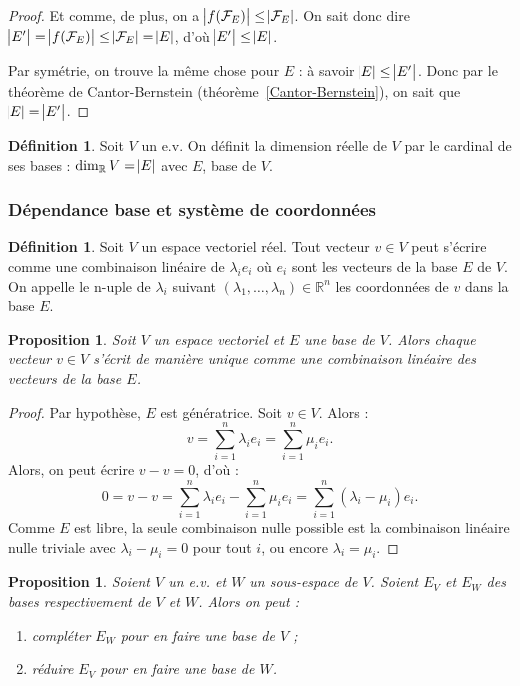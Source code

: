 \documentclass{article}
\newcommand{\R}{\mathbb R}
\newtheorem{prp}[thm]{Proposition}
\theoremstyle{definition}
\newtheorem{déf}[thm]{Définition}
\theoremstyle{remark}
\begin{document}
\begin{proof}
		Et comme, de plus, on a $\abs {f(\mathcal F_E)} \leq \abs {\mathcal F_E}$. On sait donc dire $\abs {E'} = \abs {f(\mathcal F_E)} \leq \abs {\mathcal F_E} = \abs E$,
		d'où $\abs {E'} \leq \abs E$.

		Par symétrie, on trouve la même chose pour $E$ : à savoir $\abs E \leq \abs {E'}$. Donc par le théorème de Cantor-Bernstein (théorème~\ref{Cantor-Bernstein}), on
		sait que $\abs E = \abs {E'}$. \end{proof}

		\begin{déf} Soit $V$ un e.v. On définit la dimension réelle de $V$ par le cardinal de ses bases : $\dim_\R V = \abs E$ avec $E$, base de $V$. \end{déf}
	
		\subsubsection{Dépendance base et système de coordonnées}
		\begin{déf} Soit $V$ un espace vectoriel réel. Tout vecteur $v \in V$ peut s'écrire comme une combinaison linéaire de $\lambda_ie_i$ où $e_i$ sont les vecteurs
		de la base $E$ de $V$. On appelle le n-uple de $\lambda_i$ suivant $(\lambda_1, \ldots, \lambda_n) \in \R^n$ les coordonnées de $v$ dans la base $E$. \end{déf}

		\begin{prp} Soit $V$ un espace vectoriel et $E$ une base de $V$. Alors chaque vecteur $v \in V$ s'écrit de manière unique comme une combinaison linéaire des vecteurs
		de la base $E$. \end{prp}

		\begin{proof} Par hypothèse, $E$ est génératrice. Soit $v \in V$. Alors : \[v = \sum_{i=1}^n\lambda_ie_i = \sum_{i=1}^n\mu_ie_i.\] Alors, on peut écrire $v-v = 0$,
		d'où : \[0 = v - v = \sum_{i=1}^n\lambda_ie_i - \sum_{i=1}^n\mu_ie_i = \sum_{i=1}^n(\lambda_i - \mu_i)e_i.\] Comme $E$ est libre, la seule combinaison nulle possible
		est la combinaison linéaire nulle triviale avec $\lambda_i-\mu_i=0$ pour tout $i$, ou encore $\lambda_i = \mu_i$. \end{proof}

		\begin{prp}\label{inclusionBases} Soient $V$ un e.v. et $W$ un sous-espace de $V$. Soient $E_V$ et $E_W$ des bases respectivement de $V$ et $W$. Alors on peut :
		\begin{enumerate}
			\item compléter $E_W$ pour en faire une base de $V$ ;
			\item réduire $E_V$ pour en faire une base de $W$.
		\end{enumerate}
		\end{prp}
\end{document}
